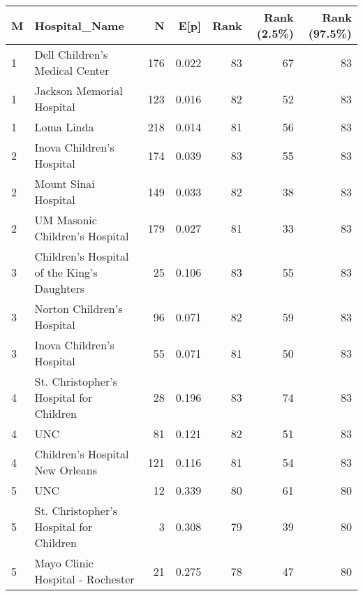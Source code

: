 \begin{tabular}{llrrrrr}
  \hline
M & Hospital\_Name & N & E[p] & Rank & Rank (2.5\%) & Rank (97.5\%) \\ 
  \hline
1 & Dell Children's Medical Center & 176 & 0.022 & 83 & 67 & 83 \\ 
  1 & Jackson Memorial Hospital & 123 & 0.016 & 82 & 52 & 83 \\ 
  1 & Loma Linda & 218 & 0.014 & 81 & 56 & 83 \\ 
  2 & Inova Children's Hospital & 174 & 0.039 & 83 & 55 & 83 \\ 
  2 & Mount Sinai Hospital & 149 & 0.033 & 82 & 38 & 83 \\ 
  2 & UM Masonic Children's Hospital & 179 & 0.027 & 81 & 33 & 83 \\ 
  3 & Children's Hospital of the King's Daughters & 25 & 0.106 & 83 & 55 & 83 \\ 
  3 & Norton Children's Hospital & 96 & 0.071 & 82 & 59 & 83 \\ 
  3 & Inova Children's Hospital & 55 & 0.071 & 81 & 50 & 83 \\ 
  4 & St. Christopher's Hospital for Children & 28 & 0.196 & 83 & 74 & 83 \\ 
  4 & UNC & 81 & 0.121 & 82 & 51 & 83 \\ 
  4 & Children's Hospital New Orleans & 121 & 0.116 & 81 & 54 & 83 \\ 
  5 & UNC & 12 & 0.339 & 80 & 61 & 80 \\ 
  5 & St. Christopher's Hospital for Children & 3 & 0.308 & 79 & 39 & 80 \\ 
  5 & Mayo Clinic Hospital - Rochester & 21 & 0.275 & 78 & 47 & 80 \\ 
   \hline
\end{tabular}
